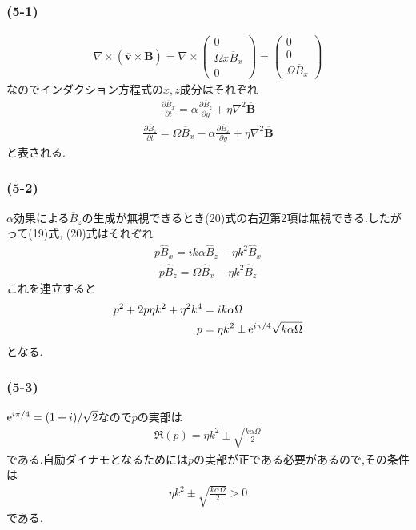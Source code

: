 \subsubsection*{(5-1)}
\begin{align}
  \nabla\times(\overline{\bm v}\times\overline{\bm B})=\nabla\times\left(
  \begin{array}{c}
    0\\\Omega x\overline{B}_x\\0
  \end{array}
  \right)=\left(
  \begin{array}{c}
    0\\0\\\Omega \overline{B}_x
  \end{array}
  \right)
\end{align}
なのでインダクション方程式の$x,z$成分はそれぞれ
\begin{align}
  \frac{\partial \overline{B}_x}{\partial t}=\alpha\frac{\partial\overline{B}_z}{\partial y}+\eta\nabla^2\overline{\bm B}
\end{align}
\begin{align}
  \frac{\partial \overline{B}_z}{\partial t}=\Omega\overline{B}_x-\alpha\frac{\partial\overline{B}_x}{\partial y}+\eta\nabla^2\overline{\bm B}
\end{align}
と表される.
\subsubsection*{(5-2)}
$\alpha$効果による$\overline{B}_z$の生成が無視できるとき(20)式の右辺第2項は無視できる.したがって(19)式, (20)式はそれぞれ
\begin{align}
  p\hat{B}_x=ik\alpha\hat{B}_z-\eta k^2\hat{B}_x
\end{align}
\begin{align}
  p\hat{B}_z=\Omega\hat{B}_x-\eta k^2\hat{B}_z
\end{align}
これを連立すると
\begin{align}
  p^2+2p\eta k^2+\eta^2k^4&=ik\alpha\Omega\nonumber\\
  p&=\eta k^2\pm{\rm e}^{i\pi/4}\sqrt{k\alpha\Omega}
\end{align}
となる.
\subsubsection*{(5-3)}
${\rm e}^{i\pi/4}=(1+i)/\sqrt{2}$なので$p$の実部は
\begin{align}
  \Re (p)=\eta k^2\pm\sqrt{\frac{k\alpha\Omega}{2}}
\end{align}
である.自励ダイナモとなるためには$p$の実部が正である必要があるので,その条件は
\begin{align}
  \eta k^2\pm\sqrt{\frac{k\alpha\Omega}{2}}>0
\end{align}
である.